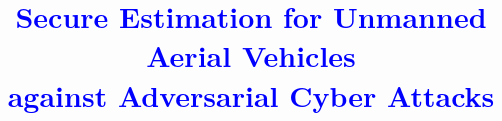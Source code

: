 \documentclass[12pt, conference, a4paper, twoside]{IEEEconf_mod}
\begin{document}
%


\title{\Large \vspace{1.8cm}
	\textcolor{blue}{Secure Estimation for Unmanned Aerial Vehicles \\against Adversarial Cyber Attacks}}


% 


\end{document}
